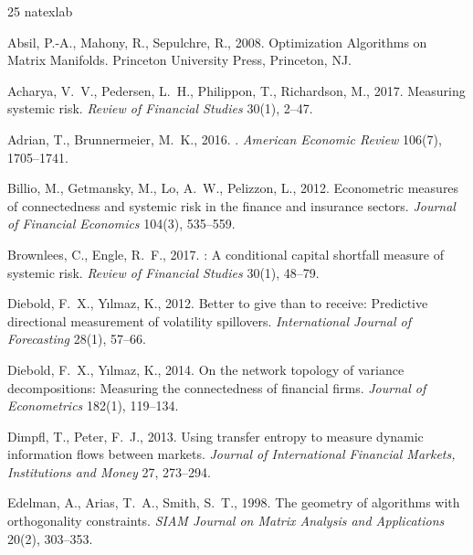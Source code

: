 \documentclass[review,12pt,authoryear]{elsarticle}
\begin{document}

\begin{thebibliography}{25}
\expandafter\ifx\csname natexlab\endcsname\relax\def\natexlab#1{#1}\fi
\providecommand{\url}[1]{\texttt{#1}}
\providecommand{\href}[2]{#2}

Absil, P.-A., Mahony, R., Sepulchre, R., 2008.
\newblock Optimization Algorithms on Matrix Manifolds.
\newblock Princeton University Press, Princeton, NJ.

Acharya, V.~V., Pedersen, L.~H., Philippon, T., Richardson, M., 2017.
\newblock Measuring systemic risk.
\newblock \emph{Review of Financial Studies} 30(1), 2--47.

Adrian, T., Brunnermeier, M.~K., 2016.
.
\newblock \emph{American Economic Review} 106(7), 1705--1741.

Billio, M., Getmansky, M., Lo, A.~W., Pelizzon, L., 2012.
\newblock Econometric measures of connectedness and systemic risk in the finance and insurance sectors.
\newblock \emph{Journal of Financial Economics} 104(3), 535--559.

Brownlees, C., Engle, R.~F., 2017.
: A conditional capital shortfall measure of systemic risk.
\newblock \emph{Review of Financial Studies} 30(1), 48--79.

Diebold, F.~X., Y{\i}lmaz, K., 2012.
\newblock Better to give than to receive: Predictive directional measurement of volatility spillovers.
\newblock \emph{International Journal of Forecasting} 28(1), 57--66.

Diebold, F.~X., Y{\i}lmaz, K., 2014.
\newblock On the network topology of variance decompositions: Measuring the connectedness of financial firms.
\newblock \emph{Journal of Econometrics} 182(1), 119--134.

Dimpfl, T., Peter, F.~J., 2013.
\newblock Using transfer entropy to measure dynamic information flows between markets.
\newblock \emph{Journal of International Financial Markets, Institutions and Money} 27, 273--294.

Edelman, A., Arias, T.~A., Smith, S.~T., 1998.
\newblock The geometry of algorithms with orthogonality constraints.
\newblock \emph{SIAM Journal on Matrix Analysis and Applications} 20(2), 303--353.


\end{thebibliography}
\end{document}
